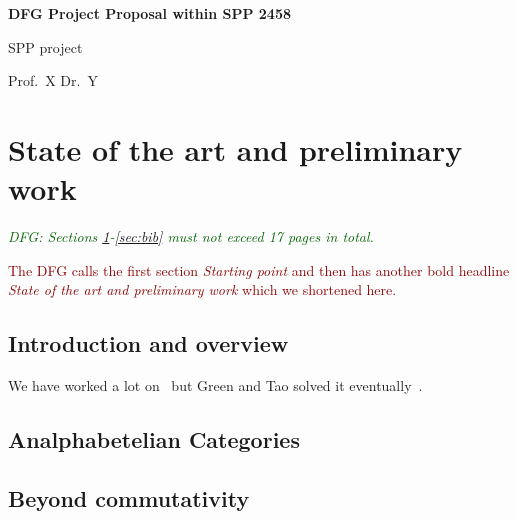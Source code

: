 \documentclass[a4paper,11pt]{amsart}
\theoremstyle{definition}
\newcommand{\<}{\langle}
\renewcommand{\>}{\rangle}
\newcommand{\dfg}[1]{\emph{\textcolor{darkgreen}{DFG: #1}}}
\newcommand{\tk}[1]{\textcolor{darkred}{#1}}
\begin{document}
\thispagestyle{empty}

\mbox{}
\bigskip

\begin{center}{\bf\large DFG Project Proposal within SPP 2458}\end{center}

\vspace{4cm}

{\bf\huge
\begin{center}
  SPP project
\end{center}
}

\vspace{4cm}

{\bf\large
\begin{center}
  Prof.~X \quad Dr.~Y
\end{center}
}

\newpage

\setcounter{tocdepth}{1}
\tableofcontents

\section{State of the art and preliminary work}
\label{sec:stateOfArt}
\dfg{Sections \ref{sec:stateOfArt}-\ref{sec:bib} must not exceed 17
  pages in total.}

\tk{The DFG calls the first section \emph{Starting point} and then has
  another bold headline \emph{State of the art and preliminary work}
  which we shortened here.}

\bigskip

\lipsum[2]

\subsection{Introduction and overview}

We have worked a lot on~\cite{x92:_analp_formal} but Green and Tao
solved it eventually~\cite{green2008primes}.  \lipsum[1]

\subsection{Analphabetelian Categories}
\label{sec:one}

\lipsum[3]

\subsection{Beyond commutativity}
\label{sec:two}
\end{document}
